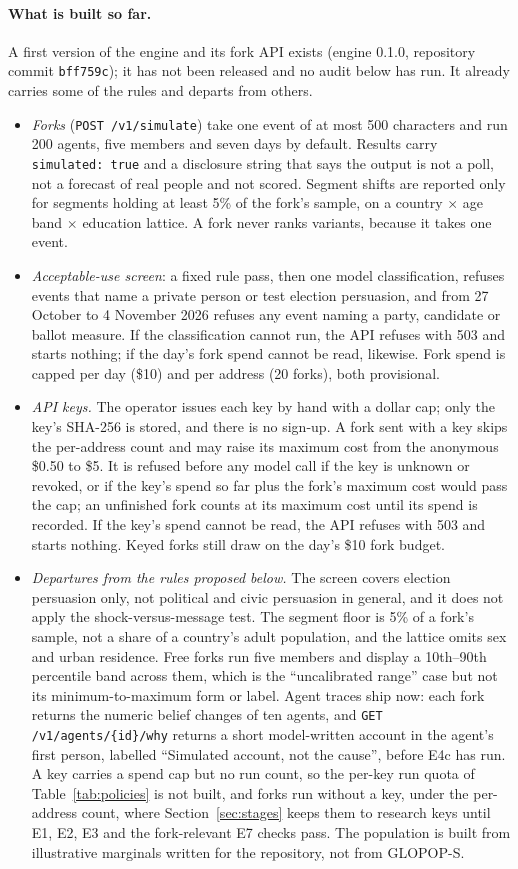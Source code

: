 \documentclass[11pt]{article}
\begin{document}
\paragraph{What is built so far.} A first version of the engine and its fork API exists (engine 0.1.0, repository commit \texttt{bff759c}); it has not been released and no audit below has run. It already carries some of the rules and departs from others.
\begin{itemize}
  \item \emph{Forks} (\texttt{POST /v1/simulate}) take one event of at most 500 characters and run 200 agents, five members and seven days by default. Results carry \texttt{simulated: true} and a disclosure string that says the output is not a poll, not a forecast of real people and not scored. Segment shifts are reported only for segments holding at least 5\% of the fork's sample, on a country $\times$ age band $\times$ education lattice. A fork never ranks variants, because it takes one event.
  \item \emph{Acceptable-use screen}: a fixed rule pass, then one model classification, refuses events that name a private person or test election persuasion, and from 27 October to 4 November 2026 refuses any event naming a party, candidate or ballot measure. If the classification cannot run, the API refuses with 503 and starts nothing; if the day's fork spend cannot be read, likewise. Fork spend is capped per day (\$10) and per address (20 forks), both provisional.
  \item \emph{API keys.} The operator issues each key by hand with a dollar cap; only the key's SHA-256 is stored, and there is no sign-up. A fork sent with a key skips the per-address count and may raise its maximum cost from the anonymous \$0.50 to \$5. It is refused before any model call if the key is unknown or revoked, or if the key's spend so far plus the fork's maximum cost would pass the cap; an unfinished fork counts at its maximum cost until its spend is recorded. If the key's spend cannot be read, the API refuses with 503 and starts nothing. Keyed forks still draw on the day's \$10 fork budget.
  \item \emph{Departures from the rules proposed below.} The screen covers election persuasion only, not political and civic persuasion in general, and it does not apply the shock-versus-message test. The segment floor is 5\% of a fork's sample, not a share of a country's adult population, and the lattice omits sex and urban residence. Free forks run five members and display a 10th--90th percentile band across them, which is the ``uncalibrated range'' case but not its minimum-to-maximum form or label. Agent traces ship now: each fork returns the numeric belief changes of ten agents, and \texttt{GET /v1/agents/\{id\}/why} returns a short model-written account in the agent's first person, labelled ``Simulated account, not the cause'', before E4c has run. A key carries a spend cap but no run count, so the per-key run quota of Table~\ref{tab:policies} is not built, and forks run without a key, under the per-address count, where Section~\ref{sec:stages} keeps them to research keys until E1, E2, E3 and the fork-relevant E7 checks pass. The population is built from illustrative marginals written for the repository, not from GLOPOP-S.

\end{itemize}
\end{document}
